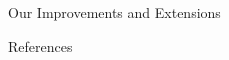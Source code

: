\documentclass[final,hyperref={pdfpagelabels=false}]{beamer}
\begin{document}
\begin{frame}[t]
\begin{columns}[t]
\begin{column}{.3\textwidth}
\begin{block}{Our Improvements and Extensions}
	
	\end{block}
	


    \begin{block}{References}
      \nocite{*} %
      \linespread{0.928}\selectfont
      \footnotesize{
      }
    \end{block}

  \end{column} %

  \begin{column}{.02\textwidth}\end{column} %

\end{columns} %

\end{frame} %
\end{document}

